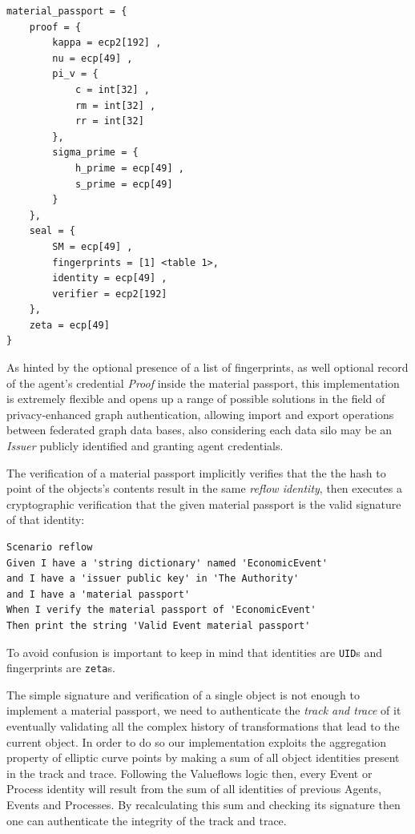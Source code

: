 \documentclass[twocolumn]{article}
\begin{document}
\begin{lstlisting}[caption={Example material passport data}]
material_passport = {
    proof = {
        kappa = ecp2[192] ,
        nu = ecp[49] ,
        pi_v = {
            c = int[32] ,
            rm = int[32] ,
            rr = int[32] 
        },
        sigma_prime = {
            h_prime = ecp[49] ,
            s_prime = ecp[49] 
        }
    },
    seal = {
        SM = ecp[49] ,
        fingerprints = [1] <table 1>,
        identity = ecp[49] ,
        verifier = ecp2[192] 
    },
    zeta = ecp[49] 
}
\end{lstlisting}

As hinted by the optional presence of a list of fingerprints, as well
optional record of the agent's credential \emph{Proof} inside the
material passport, this implementation is extremely flexible and opens
up a range of possible solutions in the field of privacy-enhanced
graph authentication, allowing import and export operations between
federated graph data bases, also considering each data silo may be an
\emph{Issuer} publicly identified and granting agent credentials.

The verification of a material passport implicitly verifies that the
the hash to point of the objects's contents result in the same
\emph{reflow identity}, then executes a cryptographic verification
that the given material passport is the valid signature of that
identity:

\begin{lstlisting}[style=zencode,caption={Verify a material passport}]
Scenario reflow
Given I have a 'string dictionary' named 'EconomicEvent'
and I have a 'issuer public key' in 'The Authority'
and I have a 'material passport'
When I verify the material passport of 'EconomicEvent'
Then print the string 'Valid Event material passport'
\end{lstlisting}

To avoid confusion is important to keep in mind that identities are
\verb!UID!s and fingerprints are \verb!zeta!s.

The simple signature and verification of a single object is not enough
to implement a material passport, we need to authenticate the
\emph{track and trace} of it eventually validating all the complex
history of transformations that lead to the current object. In order
to do so our implementation exploits the aggregation property of
elliptic curve points by making a sum of all object identities present
in the track and trace. Following the Valueflows logic then, every
Event or Process identity will result from the sum of all identities
of previous Agents, Events and Processes. By recalculating this sum
and checking its signature then one can authenticate the integrity of
the track and trace.
\end{document}
